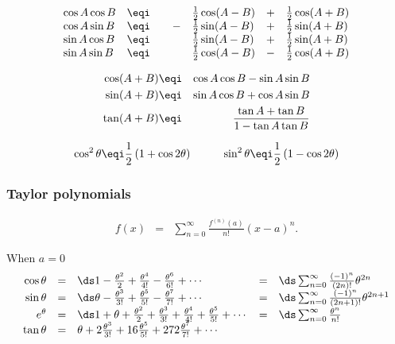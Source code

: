 \[\begin{array}{*{8}{l}}
   \cos A \cos B &\eqi& & & \frac{1}{2}\cos(A-B) &+& \frac{1}{2}\cos(A+B)  \\
   \cos A \sin B &\eqi& &-& \frac{1}{2}\sin(A-B) &+& \frac{1}{2}\sin(A+B)  \\
   \sin A \cos B &\eqi& & & \frac{1}{2}\sin(A-B) &+& \frac{1}{2}\sin(A+B)  \\
   \sin A \sin B &\eqi& & & \frac{1}{2}\cos(A-B) &-& \frac{1}{2}\cos(A+B)  
\end{array}\]

\begin{eqnarray*}
   \cos(A+B)    &\eqi& \cos A \cos B - \sin A \sin B  \\
   \sin(A+B)    &\eqi& \sin A \cos B + \cos A \sin B  \\
   \tan(A+B)    &\eqi& \frac{\tan A + \tan B}{1 - \tan A \tan B} \\
\end{eqnarray*}

\[ \cos^2\theta \eqi \frac{1}{2} \left( 1 + \cos2\theta \right) \hspace{1cm}
   \sin^2\theta \eqi \frac{1}{2} \left( 1 - \cos2\theta \right) 
\]


\subsubsection*{Taylor polynomials}
\begin{eqnarray*}
   f(x) &=& \sum_{n=0}^\infty \frac{f^{(n)}(a)}{n!}(x-a)^n.
\end{eqnarray*}

When $a=0$ 
\[\begin{array}{rclcl}
   \cos\theta 
     &=& \ds 1 - \frac{\theta^2}{2} + \frac{\theta^4}{4!} - \frac{\theta^6}{6!} + \cdots 
     &=& \ds \sum_{n=0}^\infty \frac{(-1)^n}{(2n)!}\theta^{2n}
\\
   \sin\theta 
     &=& \ds \theta - \frac{\theta^3}{3!} + \frac{\theta^5}{5!} - \frac{\theta^7}{7!} + \cdots 
     &=& \ds \sum_{n=0}^\infty \frac{(-1)^n}{(2n+1)!}\theta^{2n+1}
\\
   e^\theta
     &=& \ds 1 + \theta + \frac{\theta^2}{2} + \frac{\theta^3}{3!} + \frac{\theta^4}{4!} + \frac{\theta^5}{5!} + \cdots
     &=& \ds \sum_{n=0}^\infty \frac{\theta^n}{n!}
\\
   \tan\theta 
     &=& \theta + 2\frac{\theta^3}{3!} + 16\frac{\theta^5}{5!} + 272\frac{\theta^7}{7!} + \cdots \\
\end{array}\]

